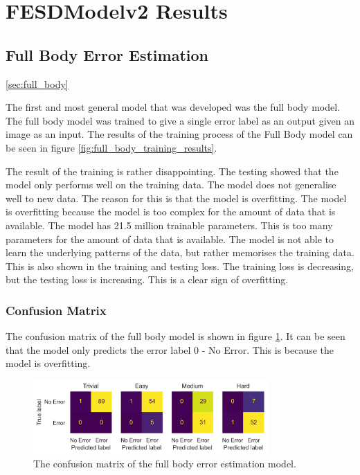 \section{FESDModelv2 Results}

\subsection{Full Body Error Estimation}
\ref{sec:full_body}

The first and most general model that was developed was the full body model. The full body model was trained to give a single error label as an output given an image as an input. The results of the training process of the Full Body model can be seen in figure \ref{fig:full_body_training_results}.

The result of the training is rather disappointing. The testing showed that the model only performs well on the training data. The model does not generalise well to new data. The reason for this is that the model is overfitting. The model is overfitting because the model is too complex for the amount of data that is available. The model has 21.5 million trainable parameters. This is too many parameters for the amount of data that is available. The model is not able to learn the underlying patterns of the data, but rather memorises the training data. This is also shown in the training and testing loss. The training loss is decreasing, but the testing loss is increasing. This is a clear sign of overfitting.

\subsubsection{Confusion Matrix}

The confusion matrix of the full body model is shown in figure \ref{fig:full_body_confusion_matrix}. It can be seen that the model only predicts the error label $0$ - No Error. This is because the model is overfitting.

\begin{figure}
  \centering
  \includegraphics[width=0.8\textwidth]{figures/results/confusion/full.png}
  \caption[Full Body model confusion matrix]{The confusion matrix of the full body error estimation model.}
  \label{fig:full_body_confusion_matrix}
\end{figure}

